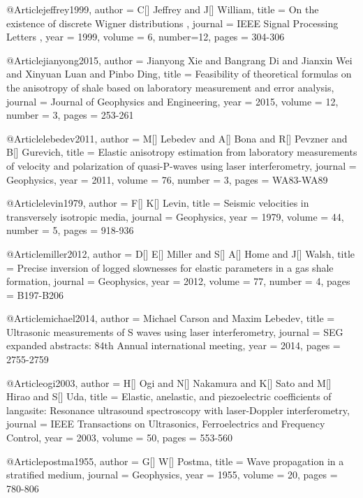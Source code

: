 @Article{jeffrey1999,
  author = 	 {C[] Jeffrey and J[] William},
  title = 	 { On the existence of discrete Wigner distributions },
  journal = 	 { IEEE Signal Processing Letters },
  year = 	 1999,
  volume = 	 6,
  number=12,
  pages = 	 {304-306}
}

@Article{jianyong2015,
  author = 	 {Jianyong Xie and Bangrang Di and Jianxin Wei and Xinyuan Luan and Pinbo Ding},
  title = 	 {Feasibility of theoretical formulas on the anisotropy of shale based on laboratory measurement and error analysis},
  journal = 	 {Journal of Geophysics and Engineering},
  year = 	 2015,
  volume = 	 12,
  number = 	 3,
  pages = 	 {253-261}}

@Article{lebedev2011,
  author = 	 {M[] Lebedev and A[] Bona and R[] Pevzner and B[] Gurevich},
  title = 	 {Elastic anisotropy estimation from laboratory measurements of velocity and polarization of quasi-P-waves using laser interferometry},
  journal = 	 {Geophysics},
  year = 	 2011,
  volume = 	 76,
  number = 	 3,
  pages = 	 {WA83-WA89}}

@Article{levin1979,
  author = 	 {F[] K[] Levin},
  title = 	 {Seismic velocities in transversely isotropic media},
  journal = 	 {Geophysics},
  year = 	 1979,
  volume = 	 44,
  number = 	 5,
  pages = 	 {918-936}}

@Article{miller2012,
  author = 	 {D[] E[] Miller and S[] A[] Home and J[] Walsh},
  title = 	 {Precise inversion of logged slownesses for elastic parameters in a gas shale formation},
  journal = 	 {Geophysics},
  year = 	 2012,
  volume = 	 77,
  number = 	 4,
  pages = 	 {B197-B206}}

@Article{michael2014,
  author = 	 {Michael Carson and Maxim Lebedev},
  title = 	 {Ultrasonic measurements of S waves using laser interferometry},
  journal = 	 {SEG expanded abstracts: 84th Annual international meeting},
  year = 	 2014,
  pages = 	 {2755-2759}}

@Article{ogi2003,
  author = 	 {H[] Ogi and N[] Nakamura and K[] Sato and M[] Hirao and S[] Uda},
  title = 	 {Elastic, anelastic, and piezoelectric coefficients of langasite: Resonance ultrasound spectroscopy with laser-Doppler interferometry},
  journal = 	 {IEEE Transactions on Ultrasonics, Ferroelectrics and Frequency Control},
  year = 	 2003,
  volume = 	 50,
  pages = 	 {553-560}}

@Article{postma1955,
  author = 	 {G[] W[] Postma},
  title = 	 {Wave propagation in a stratified medium},
  journal = 	 {Geophysics},
  year = 	 1955,
  volume = 	 20,
  pages = 	 {780-806}}

